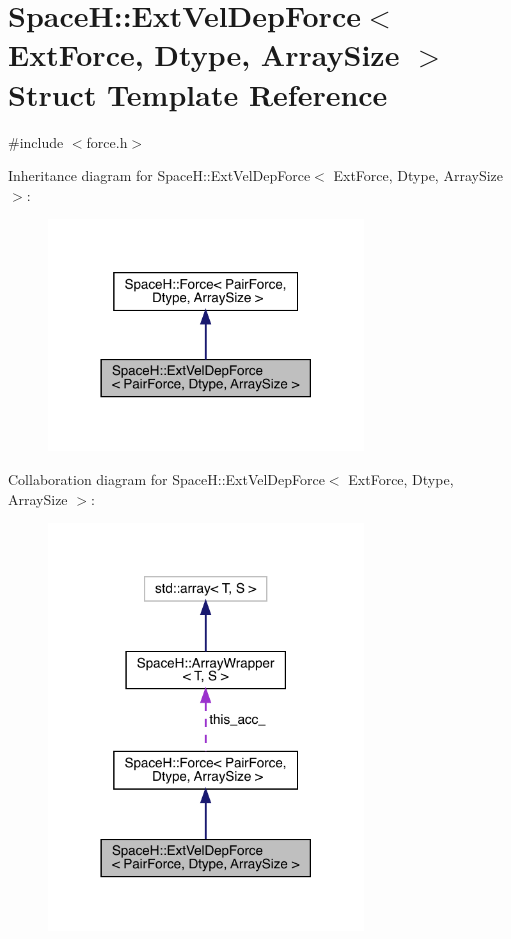 \hypertarget{struct_space_h_1_1_ext_vel_dep_force}{}\section{SpaceH\+:\+:Ext\+Vel\+Dep\+Force$<$ Ext\+Force, Dtype, Array\+Size $>$ Struct Template Reference}
\label{struct_space_h_1_1_ext_vel_dep_force}


{\ttfamily \#include $<$force.\+h$>$}



Inheritance diagram for SpaceH\+:\+:Ext\+Vel\+Dep\+Force$<$ Ext\+Force, Dtype, Array\+Size $>$\+:\nopagebreak
\begin{figure}[H]
\begin{center}
\leavevmode
\includegraphics[width=237pt]{struct_space_h_1_1_ext_vel_dep_force__inherit__graph}
\end{center}
\end{figure}


Collaboration diagram for SpaceH\+:\+:Ext\+Vel\+Dep\+Force$<$ Ext\+Force, Dtype, Array\+Size $>$\+:\nopagebreak
\begin{figure}[H]
\begin{center}
\leavevmode
\includegraphics[width=237pt]{struct_space_h_1_1_ext_vel_dep_force__coll__graph}
\end{center}
\end{figure}

